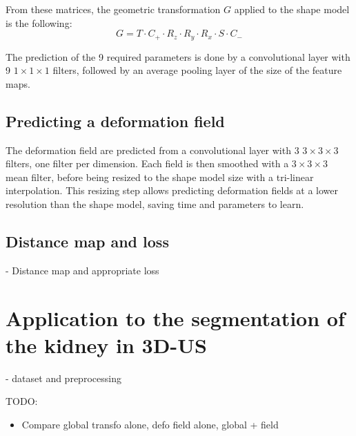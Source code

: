 From these matrices, the geometric transformation $G$ applied to the shape model is the following:
\begin{equation}
    G = T \cdot C_+ \cdot R_z \cdot R_y \cdot R_x \cdot S \cdot C_-
\end{equation}

The prediction of the 9 required parameters is done by a convolutional layer with 9 $1 \times 1 \times 1$ filters, followed by an average pooling layer of the size of the feature maps. 

\subsection{Predicting a deformation field}

The deformation field are predicted from a convolutional layer with 3 $3 \times 3 \times 3$ filters, one filter per dimension. Each field is then smoothed with a $3 \times 3 \times 3$ mean filter, before being resized to the shape model size with a tri-linear interpolation. This resizing step allows predicting deformation fields at a lower resolution than the shape model, saving time and parameters to learn.



\subsection{Distance map and loss}

- Distance map and appropriate loss

\section{Application to the segmentation of the kidney in 3D-US}

- dataset and preprocessing

TODO:
\begin{itemize}
    \item Compare global transfo alone, defo field alone, global + field
\end{itemize}


